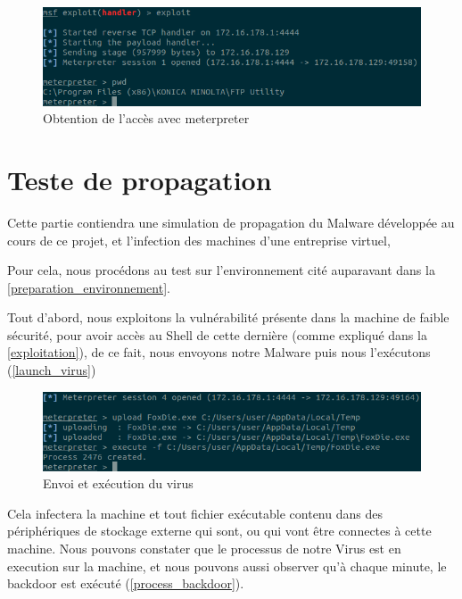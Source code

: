     \begin{figure}[H]
        \centering
        \includegraphics[width=\linewidth]{images/meterpreter.png}
        \caption{Obtention de l'accès avec meterpreter}
        \label{obtention_accees_meterpreter}
    \end{figure}

\section{Teste de propagation}
Cette partie contiendra une simulation de propagation du Malware développée au cours de ce projet, et 
l'infection des machines d'une entreprise virtuel,

Pour cela, nous procédons au test sur l’environnement cité auparavant dans la \autoref{preparation_environnement}.

Tout d'abord, nous exploitons la vulnérabilité présente dans la machine de faible sécurité, pour avoir accès au Shell de cette dernière (comme expliqué dans la \autoref{exploitation}), de ce fait, nous envoyons notre Malware puis nous l’exécutons (\autoref{launch_virus})

\begin{figure}[H]
    \centering
    \includegraphics[width=\linewidth]{images/exec_virus.png}
    \caption{Envoi et exécution du virus}
    \label{launch_virus}
\end{figure}
Cela infectera la machine et tout fichier exécutable contenu dans des périphériques de stockage externe qui sont, ou qui vont  être connectes à cette machine.  Nous pouvons constater que le processus de notre Virus est en execution sur la machine, et nous pouvons aussi observer qu'à chaque minute, le backdoor est exécuté (\autoref{process_backdoor}).

